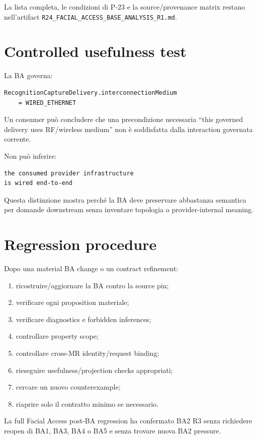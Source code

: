 \documentclass[11pt,a4paper]{article}
\newcommand{\code}[1]{\nolinkurl{#1}}
\begin{document}
La lista completa, le condizioni di P-23 e la source/provenance matrix restano nell'artifact \code{R24_FACIAL_ACCESS_BASE_ANALYSIS_R1.md}.

\section{Controlled usefulness test}

La BA governa:

\begin{lstlisting}
RecognitionCaptureDelivery.interconnectionMedium
    = WIRED_ETHERNET
\end{lstlisting}

Un consumer può concludere che una precondizione necessaria ``this governed delivery uses RF/wireless medium'' non è soddisfatta dalla interaction governata corrente.

Non può inferire:

\begin{lstlisting}
the consumed provider infrastructure
is wired end-to-end
\end{lstlisting}

Questa distinzione mostra perché la BA deve preservare abbastanza semantica per domande downstream senza inventare topologia o provider-internal meaning.

\section{Regression procedure}

Dopo una material BA change o un contract refinement:

\begin{enumerate}
\item ricostruire/aggiornare la BA contro la source pin;
\item verificare ogni proposition materiale;
\item verificare diagnostics e forbidden inferences;
\item controllare property scope;
\item controllare cross-MR identity/request binding;
\item rieseguire usefulness/projection checks appropriati;
\item cercare un nuovo counterexample;
\item riaprire solo il contratto minimo se necessario.
\end{enumerate}

La full Facial Access post-BA regression ha confermato BA2 R3 senza richiedere reopen di BA1, BA3, BA4 o BA5 e senza trovare nuova BA2 pressure.
\end{document}
